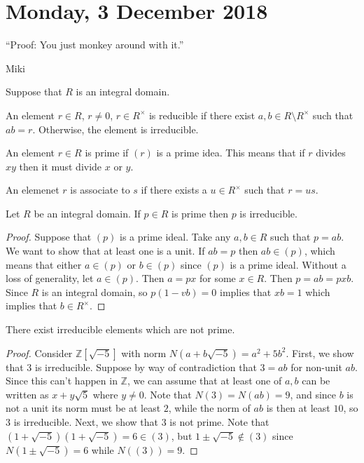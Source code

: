 \section{Monday, 3 December 2018}

\epigraph{``Proof: You just monkey around with it.''}{Miki}

Suppose that $R$ is an integral domain.

\begin{definition}[Reducible]
 An element $r \in R$, $r \not= 0$, $r \in R^\times$ is reducible if there exist $a,b \in R \setminus R^\times$ such that $ab = r$. Otherwise, the element is irreducible.
\end{definition}

\begin{definition}
An element $r \in R$ is prime if $(r)$ is a prime idea. This means that if $r$ divides $xy$ then it must divide $x$ or $y$.
\end{definition}

\begin{definition}
An elemenet $r$ is associate to $s$ if there exists a $u \in R^\times$ such that $r=us$.
\end{definition}

\begin{proposition}
Let $R$ be an integral domain. If $p \in R$ is prime then $p$ is irreducible.
\end{proposition}

\begin{proof}
Suppose that $(p)$ is a prime ideal. Take any $a,b \in R$ such that $p = ab$. We want to show that at least one is a unit. If $ab = p$ then $ab \in (p)$, which means that either $a \in (p)$ or $b \in (p)$ since $(p)$ is a prime ideal. Without a loss of generality, let $a \in (p)$. Then $a = px$ for some $x \in R$. Then $p = ab = pxb$. Since $R$ is an integral domain, so $p(1-vb) = 0$ implies that $xb = 1$ which implies that $b \in R^\times$. 
\end{proof}

\begin{proposition}
There exist irreducible elements which are not prime.
\end{proposition}

\begin{proof}
Consider $\mathbb{Z}[\sqrt{-5}]$ with norm $N(a+b\sqrt{-5}) = a^2 + 5b^2$. First, we show that $3$ is irreducible. Suppose by way of contradiction that $3=ab$ for non-unit $ab$. Since this can't happen in $\mathbb{Z}$, we can assume that at least one of $a,b$ can be written as $x + y\sqrt{5}$ where $y \not=0$. Note that $N(3) = N(ab) = 9$, and since $b$ is not a unit its norm must be at least $2$, while the norm of $ab$ is then at least $10$, so $3$ is irreducible. Next, we show that $3$ is not prime. Note that $(1+\sqrt{-5})(1+\sqrt{-5}) = 6 \in (3)$, but $1 \pm \sqrt{-5} \notin (3)$ since $N(1 \pm \sqrt{-5}) = 6$ while $N((3)) = 9$.
\end{proof}

